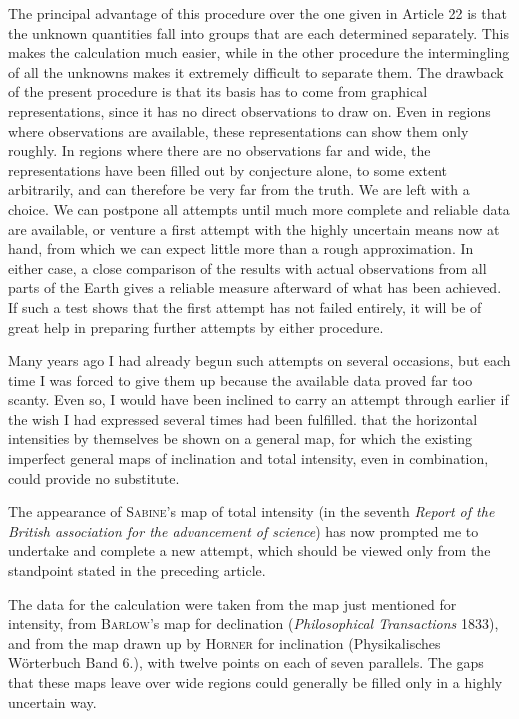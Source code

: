 The principal advantage of this procedure over the one given in Article 22 is that the unknown quantities fall into groups that are each determined separately. This makes the calculation much easier, while in the other procedure the intermingling of all the unknowns makes it extremely difficult to separate them. The drawback of the present procedure is that its basis has to come from graphical representations, since it has no direct observations to draw on. Even in regions where observations are available, these representations can show them only roughly. In regions where there are no observations far and wide, the representations have been filled out by conjecture alone, to some extent arbitrarily, and can therefore be very far from the truth. We are left with a choice. We can postpone all attempts until much more complete and reliable data are available, or venture a first attempt with the highly uncertain means now at hand, from which we can expect little more than a rough approximation. In either case, a close comparison of the results with actual observations from all parts of the Earth gives a reliable measure afterward of what has been achieved. If such a test shows that the first attempt has not failed entirely, it will be of great help in preparing further attempts by either procedure.

Many years ago I had already begun such attempts on several occasions, but each time I was forced to give them up because the available data proved far too scanty. Even so, I would have been inclined to carry an attempt through earlier if the wish I had expressed several times had been fulfilled. that the horizontal intensities by themselves be shown on a general map, for which the existing imperfect general maps of inclination and total intensity, even in combination, could provide no substitute.

The appearance of \textsc{Sabine}'s map of total intensity (in the seventh \textit{Report of the British association for the advancement of science}) has now prompted me to undertake and complete a new attempt, which should be viewed only from the standpoint stated in the preceding article.

The data for the calculation were taken from the map just mentioned for intensity, from \textsc{Barlow}'s map for declination (\textit{Philosophical Transactions} 1833), and from the map drawn up by \textsc{Horner} for inclination (Physikalisches Wörterbuch Band 6.), with twelve points on each of seven parallels. The gaps that these maps leave over wide regions could generally be filled only in a highly uncertain way.

